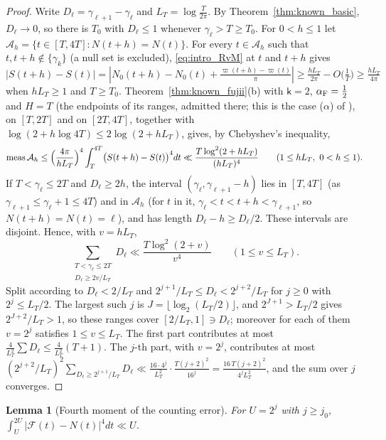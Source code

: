 \documentclass[11pt,a4paper]{article}
\makeatletter
\numberwithin{equation}{section}
\DeclareRobustCommand{\CGref}[1]{\ref{#1}}
\DeclareRobustCommand{\CGeqref}[1]{\eqref{#1}}
\DeclareRobustCommand{\CGcite}[2][]{\if\relax\detokenize{#1}\relax\cite{#2}\else\cite[#1]{#2}\fi}
\let\CG@origref\ref
\let\CG@origeqref\eqref
\newcommand{\CG@gettip}[1]{\@ifundefined{CGTip@#1}{#1}{\csname CGTip@#1\endcsname}}
\newcommand{\CG@getbib}[1]{\@ifundefined{CGBib@#1}{#1}{\csname CGBib@#1\endcsname}}
\DeclareRobustCommand{\CGref}[1]{\pdftooltip{\CG@origref{#1}}{\CG@gettip{#1}}}
\DeclareRobustCommand{\CGeqref}[1]{\pdftooltip{\CG@origeqref{#1}}{\CG@gettip{#1}}}
\DeclareRobustCommand{\CGcite}[2][]{\pdftooltip{\if\relax\detokenize{#1}\relax\cite{#2}\else\cite[#1]{#2}\fi}{\CG@getbib{#2}}}
\newtheorem{lemma}[theorem]{Lemma}
\theoremstyle{definition}
\theoremstyle{remark}
\newcommand{\Nz}{N_0} %
\newcommand{\Fc}{\mathcal F}
\newcommand{\meas}{\operatorname{meas}}
\makeatother
\begin{document}
\begin{proof}
Write $D_\ell=\gamma_{\ell+1}-\gamma_\ell$ and $L_T=\log\frac T{2\pi}$. By Theorem~\CGref{thm:known_basic}, $D_\ell\to0$, so there is $T_0$ with $D_\ell\le1$ whenever $\gamma_\ell>T\ge T_0$. For $0<h\le1$ let $\mathcal A_h=\{t\in[T,4T]:N(t+h)=N(t)\}$. For every $t\in\mathcal A_h$ such that $t,t+h\notin\{\gamma_k\}$ (a null set is excluded), \CGeqref{eq:intro_RvM} at $t$ and $t+h$ gives $|S(t+h)-S(t)|=|\Nz(t+h)-\Nz(t)+\frac{\varpi(t+h)-\varpi(t)}\pi|\ge\frac{hL_T}{2\pi}-O\bigl(\frac1T\bigr)\ge\frac{hL_T}{4\pi}$ when $hL_T\ge1$ and $T\ge T_0$. Theorem~\CGref{thm:known_fujii}(b) with $\mathsf k=2$, $\alpha_{\rm F}=\frac12$ and $H=T$ (the endpoints of its ranges, admitted there; this is the case ($\alpha$) of \CGcite{Fujii1981}), on $[T,2T]$ and on $[2T,4T]$, together with $\log(2+h\log4T)\le2\log(2+hL_T)$, gives, by Chebyshev's inequality,
\begin{equation}
\meas\mathcal A_h\le\Bigl(\frac{4\pi}{hL_T}\Bigr)^4\int_T^{4T}\bigl(S(t+h)-S(t)\bigr)^4dt\ll\frac{T\log^2(2+hL_T)}{(hL_T)^4}\qquad(1\le hL_T,\ 0<h\le1).
\label{eq:disp_24}
\end{equation}
If $T<\gamma_\ell\le2T$ and $D_\ell\ge2h$, the interval $(\gamma_\ell,\gamma_{\ell+1}-h)$ lies in $[T,4T]$ (as $\gamma_{\ell+1}\le\gamma_\ell+1\le4T$) and in $\mathcal A_h$ (for $t$ in it, $\gamma_\ell<t<t+h<\gamma_{\ell+1}$, so $N(t+h)=N(t)=\ell$), and has length $D_\ell-h\ge D_\ell/2$. These intervals are disjoint. Hence, with $v=hL_T$,
\begin{equation}
\sum_{\substack{T<\gamma_\ell\le2T\\ D_\ell\ge2v/L_T}}D_\ell\ll\frac{T\log^2(2+v)}{v^4}\qquad(1\le v\le L_T).
\label{eq:disp_25}
\end{equation}
Split according to $D_\ell<2/L_T$ and $2^{j+1}/L_T\le D_\ell<2^{j+2}/L_T$ for $j\ge0$ with $2^j\le L_T/2$. The largest such $j$ is $J=\lfloor\log_2(L_T/2)\rfloor$, and $2^{J+1}>L_T/2$ gives $2^{J+2}/L_T>1$, so these ranges cover $[2/L_T,1]\ni D_\ell$; moreover for each of them $v=2^j$ satisfies $1\le v\le L_T$. The first part contributes at most $\frac4{L_T^2}\sum D_\ell\le\frac4{L_T^2}(T+1)$. The $j$-th part, with $v=2^j$, contributes at most $(2^{j+2}/L_T)^2\sum_{D_\ell\ge2^{j+1}/L_T}D_\ell\ll\frac{16\cdot4^j}{L_T^2}\cdot\frac{T(j+2)^2}{16^j}=\frac{16\,T(j+2)^2}{4^jL_T^2}$, and the sum over $j$ converges.
\end{proof}

\begin{lemma}[Fourth moment of the counting error]\label{lem:fourth}
For $U=2^j$ with $j\ge j_0$, $\int_U^{2U}|\Fc(t)-N(t)|^4dt\ll U$.
\end{lemma}
\end{document}
